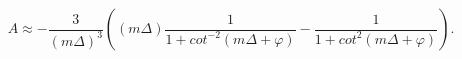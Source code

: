 \begin{equation}
   A \approx -\frac{3}{(m \Delta)^3}( (m \Delta) \frac{1}{1+cot^{-2}(m \Delta + \varphi)}-
 \frac{1}{1+cot^{2}(m \Delta + \varphi)}).
\end{equation}

